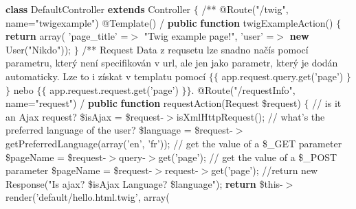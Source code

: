 \bigbreak
\begingroup\typoscale[800/10]
\localcolor
{} {\bf {\Green class}} DefaultController {\bf {\Green extends}} Controller\codetexNewline
{} $\{$\codetexNewline
{} \codetexNewline
{} {\Grey /**}\codetexNewline
{} {\Grey * @Route("/twig", name="twigexample")}\codetexNewline
{} {\Grey * @Template()}\codetexNewline
{} {\Grey */}\codetexNewline
{} {\bf {\Green public}} {\bf {\Green function}} twigExampleAction() $\{$\codetexNewline
{} {\bf {\Green return}} array(\codetexNewline
{} {\Cyan 'page\_title'} =$>$ {\Cyan "Twig example page!"},\codetexNewline
{} {\Cyan 'user'} =$>$ {\bf {\Green new}} User({\Cyan "Nikdo"}));\codetexNewline
{} $\}$\codetexNewline
{} \codetexNewline
{} {\Grey /**}\codetexNewline
{} {\Grey * Request}\codetexNewline
{} {\Grey * Data z requsetu lze snadno načís pomocí parametru, který není specifikován v url, ale jen jako parametr,}\codetexNewline
{} {\Grey * který je dodán automaticky.}\codetexNewline
{} {\Grey * Lze to i získat v templatu pomocí $\{$$\{$ app.request.query.get('page') $\}$$\}$ nebo $\{$$\{$ app.request.request.get('page') $\}$$\}$.}\codetexNewline
{} {\Grey *}\codetexNewline
{} {\Grey * @Route("/requestInfo", name="request")}\codetexNewline
{} {\Grey */}\codetexNewline
{} {\bf {\Green public}} {\bf {\Green function}} requestAction(Request \$request)\codetexNewline
{} $\{$\codetexNewline
{} {\Grey // is it an Ajax request?}\codetexNewline
{} \$isAjax = \$request-$>$isXmlHttpRequest();\codetexNewline
{} \codetexNewline
{} {\Grey // what's the preferred language of the user?}\codetexNewline
{} \$language = \$request-$>$getPreferredLanguage(array({\Cyan 'en'}, {\Cyan 'fr'}));\codetexNewline
{} \codetexNewline
{} {\Grey // get the value of a \$\_GET parameter}\codetexNewline
{} \$pageName = \$request-$>$query-$>$get({\Cyan 'page'});\codetexNewline
{} \codetexNewline
{} {\Grey // get the value of a \$\_POST parameter}\codetexNewline
{} \$pageName = \$request-$>$request-$>$get({\Cyan 'page'});\codetexNewline
{} \codetexNewline
{} {\Grey //return new Response("Is ajax? \$isAjax  Language? \$language");}\codetexNewline
{} {\bf {\Green return}} \$this-$>$render({\Cyan 'default/hello.html.twig'}, array(\codetexNewline
